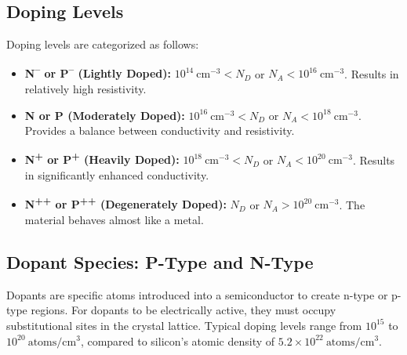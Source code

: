 \documentclass{report}
\begin{document}
\subsection{Doping Levels}
Doping levels are categorized as follows:
\begin{itemize}
    \item \textbf{N\textsuperscript{--} or P\textsuperscript{--} (Lightly Doped):} $10^{14}~\text{cm}^{-3} < N_{D}$ or $N_{A} < 10^{16}~\text{cm}^{-3}$. Results in relatively high resistivity.
    \item \textbf{N or P (Moderately Doped):} $10^{16}~\text{cm}^{-3} < N_{D}$ or $N_{A} < 10^{18}~\text{cm}^{-3}$. Provides a balance between conductivity and resistivity.
    \item \textbf{N\textsuperscript{+} or P\textsuperscript{+} (Heavily Doped):} $10^{18}~\text{cm}^{-3} < N_{D}$ or $N_{A} < 10^{20}~\text{cm}^{-3}$. Results in significantly enhanced conductivity.
    \item \textbf{N\textsuperscript{++} or P\textsuperscript{++} (Degenerately Doped):} $N_{D}$ or $N_{A} > 10^{20}~\text{cm}^{-3}$. The material behaves almost like a metal.
\end{itemize}

\subsection{Dopant Species: P-Type and N-Type}
Dopants are specific atoms introduced into a semiconductor to create n-type or p-type regions. For dopants to be electrically active, they must occupy substitutional sites in the crystal lattice. Typical doping levels range from $10^{15}$ to $10^{20}~\text{atoms}/\text{cm}^3$, compared to silicon's atomic density of $5.2 \times 10^{22}~\text{atoms}/\text{cm}^3$.
\end{document}
